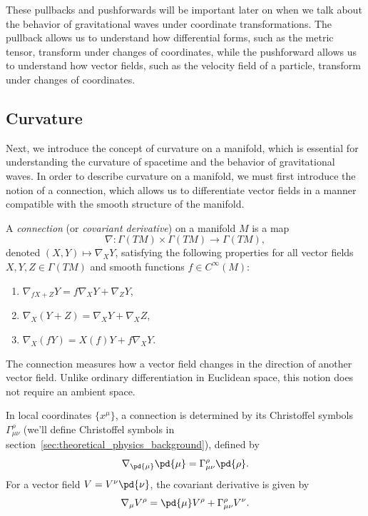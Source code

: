 \begin{note}
  These pullbacks and pushforwards will be important later on when we talk about the behavior of gravitational waves under coordinate transformations. The pullback allows us to understand how differential forms, such as the metric tensor, transform under changes of coordinates, while the pushforward allows us to understand how vector fields, such as the velocity field of a particle, transform under changes of coordinates.
\end{note}



\subsection{Curvature} Next, we introduce the concept of curvature on a manifold, which is essential for understanding the curvature of spacetime and the behavior of gravitational waves. In order to describe curvature on a manifold, we must first introduce the notion of a connection, which allows us to differentiate vector fields in a manner compatible with the smooth structure of the manifold.

\begin{definition}
  A \emph{connection} (or \emph{covariant derivative}) on a manifold $M$ is a map
  \[%
    \nabla : \Gamma(TM) \times \Gamma(TM) \to \Gamma(TM)
  ,\]%
  denoted $(X,Y) \mapsto \nabla_X Y$, satisfying the following properties for all vector fields $X,Y,Z \in \Gamma(TM)$ and smooth functions $f \in C^\infty(M)$:
  \begin{enumerate}
    \item $\nabla_{fX + Z} Y = f \nabla_X Y + \nabla_Z Y$,
    \item $\nabla_X (Y + Z) = \nabla_X Y + \nabla_X Z$,
    \item $\nabla_X (fY) = X(f) Y + f \nabla_X Y$.
  \end{enumerate}
\end{definition}

The connection measures how a vector field changes in the direction of another vector field. Unlike ordinary differentiation in Euclidean space, this notion does not require an ambient space.

In local coordinates $\{x^\mu\}$, a connection is determined by its Christoffel symbols $\Gamma^\rho_{\mu\nu}$ (we'll define Christoffel symbols in section~\ref{sec:theoretical_physics_background}), defined by
\[%
  \nabla_{\pd{\mu}} \pd{\mu} = \Gamma^\rho_{\mu\nu} \pd{\rho}
.\]%
For a vector field $V = V^\nu \pd{\nu}$, the covariant derivative is given by
\[%
  \nabla_\mu V^\rho = \pd{\mu} V^\rho + \Gamma^\rho_{\mu\nu} V^\nu
.\]%

